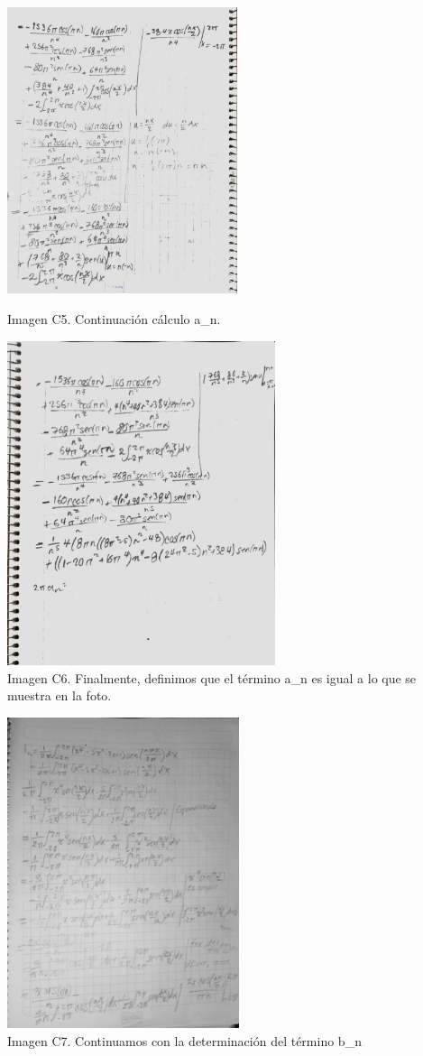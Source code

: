 \includegraphics[width=2.66175in,height=3.30729in]{media/image15.jpg}

Imagen C5. Continuación cálculo a\_n.

\includegraphics[width=3.09896in,height=3.74243in]{media/image45.jpg}\\ Imagen C6. Finalmente, definimos que el término a\_n es igual a lo que se muestra en la foto.

\includegraphics[width=2.6836in,height=3.58854in]{media/image26.jpg}\\ Imagen C7. Continuamos con la determinación del término b\_n

